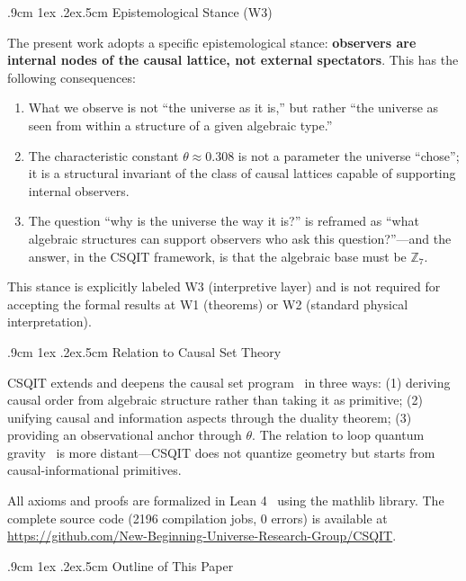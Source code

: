 \documentclass[aps,prd,twocolumn,nofootinbib,floatfix]{revtex4-2}
\makeatletter
\def\subsection{%
  \@startsection{subsection}{2}{\z@}
    {.9cm \@plus1ex \@minus .2ex}{.5cm}
    {\normalfont\normalsize\bfseries\centering}%
}
\makeatother
\begin{document}
\subsection{Epistemological Stance (W3)}

The present work adopts a specific epistemological stance: \textbf{observers are internal nodes of the causal lattice, not external spectators}. This has the following consequences:

\begin{enumerate}
    \item What we observe is not ``the universe as it is,'' but rather ``the universe as seen from within a structure of a given algebraic type.''
    \item The characteristic constant $\theta \approx 0.308$ is not a parameter the universe ``chose''; it is a structural invariant of the class of causal lattices capable of supporting internal observers.
    \item The question ``why is the universe the way it is?'' is reframed as ``what algebraic structures can support observers who ask this question?''---and the answer, in the CSQIT framework, is that the algebraic base must be $\mathbb{Z}_7$.
\end{enumerate}

This stance is explicitly labeled W3 (interpretive layer) and is not required for accepting the formal results at W1 (theorems) or W2 (standard physical interpretation).

\subsection{Relation to Causal Set Theory}

CSQIT extends and deepens the causal set program~\cite{Bombelli1987, Sorkin2005} in three ways: (1) deriving causal order from algebraic structure rather than taking it as primitive; (2) unifying causal and information aspects through the duality theorem; (3) providing an observational anchor through $\theta$. The relation to loop quantum gravity~\cite{Ambjorn1995} is more distant---CSQIT does not quantize geometry but starts from causal-informational primitives.

All axioms and proofs are formalized in Lean 4~\cite{Lean2024} using the mathlib library. The complete source code (2196 compilation jobs, 0 errors) is available at \url{https://github.com/New-Beginning-Universe-Research-Group/CSQIT}.

\subsection{Outline of This Paper}
\end{document}
